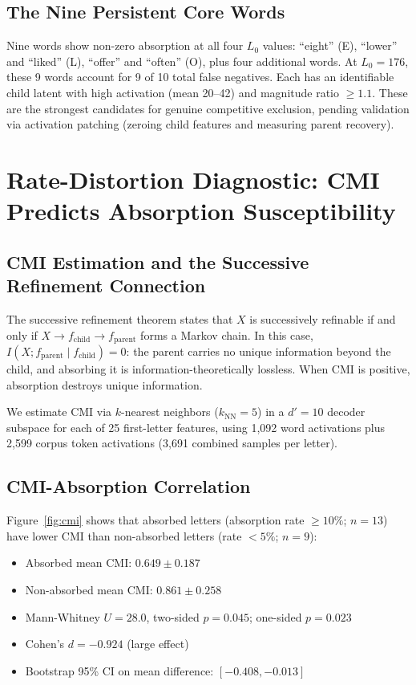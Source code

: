 \documentclass{article}
\begin{document}
\subsection{The Nine Persistent Core Words}

Nine words show non-zero absorption at all four $L_0$ values: ``eight'' (E), ``lower'' and ``liked'' (L), ``offer'' and ``often'' (O), plus four additional words. At $L_0{=}176$, these 9 words account for 9 of 10 total false negatives. Each has an identifiable child latent with high activation (mean 20--42) and magnitude ratio $\geq 1.1$. These are the strongest candidates for genuine competitive exclusion, pending validation via activation patching (zeroing child features and measuring parent recovery).


\section{Rate-Distortion Diagnostic: CMI Predicts Absorption Susceptibility}
\label{sec:cmi}

\subsection{CMI Estimation and the Successive Refinement Connection}

The successive refinement theorem \citep{equitz1991successive} states that $X$ is successively refinable if and only if $X \to f_{\text{child}} \to f_{\text{parent}}$ forms a Markov chain. In this case, $I(X; f_{\text{parent}} \mid f_{\text{child}}) = 0$: the parent carries no unique information beyond the child, and absorbing it is information-theoretically lossless. When CMI is positive, absorption destroys unique information.

We estimate CMI via $k$-nearest neighbors \citep{kraskov2004estimating} ($k_{\text{NN}} = 5$) in a $d' = 10$ decoder subspace for each of 25 first-letter features, using 1,092 word activations plus 2,599 corpus token activations (3,691 combined samples per letter).

\subsection{CMI-Absorption Correlation}

Figure~\ref{fig:cmi} shows that absorbed letters (absorption rate $\geq 10\%$; $n = 13$) have lower CMI than non-absorbed letters (rate $< 5\%$; $n = 9$):
\begin{itemize}
\item Absorbed mean CMI: $0.649 \pm 0.187$
\item Non-absorbed mean CMI: $0.861 \pm 0.258$
\item Mann-Whitney $U = 28.0$, two-sided $p = 0.045$; one-sided $p = 0.023$
\item Cohen's $d = -0.924$ (large effect)
\item Bootstrap 95\% CI on mean difference: $[-0.408, -0.013]$
\end{itemize}
\end{document}
